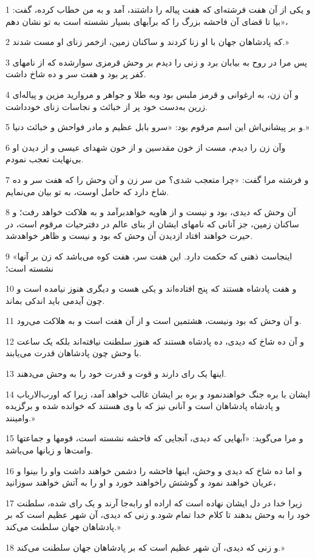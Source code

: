 \par 1 و یکی از آن هفت فرشته‌ای که هفت پیاله را داشتند، آمد و به من خطاب کرده، گفت: «بیا تا قضای آن فاحشه بزرگ را که برآبهای بسیار نشسته است به تو نشان دهم،
\par 2 که پادشاهان جهان با او زنا کردند و ساکنان زمین، ازخمر زنای او مست شدند.»
\par 3 پس مرا در روح به بیابان برد و زنی را دیدم بر وحش قرمزی سوارشده که از نامهای کفر پر بود و هفت سر و ده شاخ داشت.
\par 4 و آن زن، به ارغوانی و قرمز ملبس بود وبه طلا و جواهر و مروارید مزین و پیاله‌ای زرین به‌دست خود پر از خبائث و نجاسات زنای خودداشت.
\par 5 و بر پیشانی‌اش این اسم مرقوم بود: «سرو بابل عظیم و مادر فواحش و خبائث دنیا.»
\par 6 وآن زن را دیدم، مست از خون مقدسین و از خون شهدای عیسی و از دیدن او بی‌نهایت تعجب نمودم.
\par 7 و فرشته مرا گفت: «چرا متعجب شدی؟ من سر زن و آن وحش را که هفت سر و ده شاخ دارد که حامل اوست، به تو بیان می‌نمایم.
\par 8 آن وحش که دیدی، بود و نیست و از هاویه خواهدبرآمد و به هلاکت خواهد رفت؛ و ساکنان زمین، جز آنانی که نامهای ایشان از بنای عالم در دفترحیات مرقوم است، در حیرت خواهند افتاد ازدیدن آن وحش که بود و نیست و ظاهر خواهدشد.
\par 9 «اینجاست ذهنی که حکمت دارد. این هفت سر، هفت کوه می‌باشد که زن بر آنها نشسته است؛
\par 10 و هفت پادشاه هستند که پنج افتاده‌اند و یکی هست و دیگری هنوز نیامده است و چون آیدمی باید اندکی بماند.
\par 11 و آن وحش که بود ونیست، هشتمین است و از آن هفت است و به هلاکت می‌رود.
\par 12 و آن ده شاخ که دیدی، ده پادشاه هستند که هنوز سلطنت نیافته‌اند بلکه یک ساعت با وحش چون پادشاهان قدرت می‌یابند.
\par 13 اینها یک رای دارند و قوت و قدرت خود را به وحش می‌دهند.
\par 14 ایشان با بره جنگ خواهندنمود و بره بر ایشان غالب خواهد آمد، زیرا که اورب‌الارباب و پادشاه پادشاهان است و آنانی نیز که با وی هستند که خوانده شده و برگزیده وامینند.»
\par 15 و مرا می‌گوید: «آبهایی که دیدی، آنجایی که فاحشه نشسته است، قومها و جماعتها وامت‌ها و زبانها می‌باشد.
\par 16 و اما ده شاخ که دیدی و وحش، اینها فاحشه را دشمن خواهند داشت واو را بینوا و عریان خواهند نمود و گوشتش راخواهند خورد و او را به آتش خواهند سوزانید،
\par 17 زیرا خدا در دل ایشان نهاده است که اراده او رابه‌جا آرند و یک رای شده، سلطنت خود را به وحش بدهند تا کلام خدا تمام شود.و زنی که دیدی، آن شهر عظیم است که بر پادشاهان جهان سلطنت می‌کند.»
\par 18 و زنی که دیدی، آن شهر عظیم است که بر پادشاهان جهان سلطنت می‌کند.»

